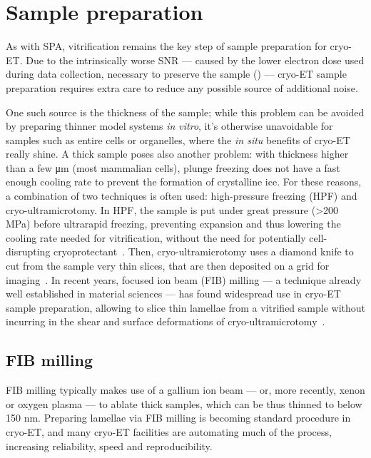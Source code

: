 \section{Sample preparation}
As with SPA, vitrification remains the key step of sample preparation for cryo-ET.
Due to the intrinsically worse SNR --- caused by the lower electron dose used during data collection, necessary to preserve the sample () --- cryo-ET sample preparation requires extra care to reduce any possible source of additional noise.

One such source is the thickness of the sample; while this problem can be avoided by preparing thinner model systems \textit{in vitro}, it's otherwise unavoidable for samples such as entire cells or organelles, where the \textit{in situ} benefits of cryo-ET really shine.
A thick sample poses also another problem: with thickness higher than a few μm (most mammalian cells), plunge freezing does not have a fast enough cooling rate to prevent the formation of crystalline ice.
For these reasons, a combination of two techniques is often used: high-pressure freezing (HPF) and cryo-ultramicrotomy.
In HPF, the sample is put under great pressure (>200 MPa) before ultrarapid freezing, preventing expansion and thus lowering the cooling rate needed for vitrification, without the need for potentially cell-disrupting cryoprotectant~\cite{moorInfluenceHighPressure1980,bergerCryoelectronTomographyFocused2023}.
Then, cryo-ultramicrotomy uses a diamond knife to cut from the sample very thin slices, that are then deposited on a grid for imaging~\cite{peaseElectronMicroscopyUltramicrotomy1981}.
In recent years, focused ion beam (FIB) milling --- a technique already well established in material sciences --- has found widespread use in cryo-ET sample preparation, allowing to slice thin lamellae from a vitrified sample without incurring in the shear and surface deformations of cryo-ultramicrotomy~\cite{markoFocusedionbeamThinningFrozenhydrated2007}.

\subsection{FIB milling}
FIB milling typically makes use of a gallium ion beam --- or, more recently, xenon or oxygen plasma --- to ablate thick samples, which can be thus thinned to below 150 nm.
Preparing lamellae via FIB milling is becoming standard procedure in cryo-ET, and many cryo-ET facilities are automating much of the process, increasing reliability, speed and reproducibility.

